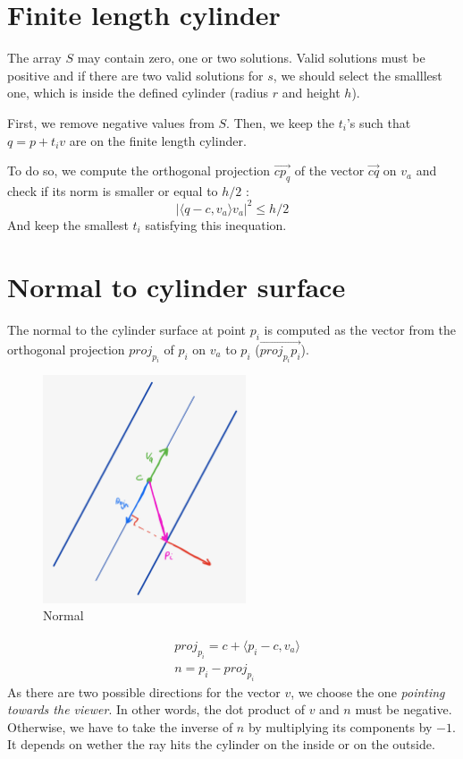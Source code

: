 \documentclass{article}
\begin{document}
\section{Finite length cylinder}
The array $S$ may contain zero, one or two solutions. Valid solutions must be positive and if there are two valid solutions for $s$, we should select the smalllest one, which is inside the defined cylinder (radius $r$ and height $h$).

First, we remove negative values from $S$. Then, we keep the $t_i$'s such that $q = p+t_iv$ are on the finite length cylinder.

To do so, we compute the orthogonal projection $\overrightarrow{cp_q}$ of the vector $\overrightarrow{cq}$ on $v_a$ and check if its norm is smaller or equal to $h/2$ :
$$|\langle q-c, v_a\rangle v_a|^2 \leq h/2$$
And keep the smallest $t_i$ satisfying this inequation.

\section{Normal to cylinder surface}

The normal to the cylinder surface at point $p_i$ is computed as the vector from the orthogonal projection $proj_{p_i}$ of $p_i$ on $v_a$ to $p_i$ ($\overrightarrow{proj_{p_i}p_i}$).

\begin{figure}[h]
\centering
\includegraphics[width=6cm]{res/Normal_sketch.jpeg}
\caption{Normal}
\end{figure}


\begin{align*}
    &proj_{p_i} = c + \langle p_i-c, v_a \rangle \\
    &n = p_i - proj_{p_i}
\end{align*}
As there are two possible directions for the vector $v$, we choose the one \textit{pointing towards the viewer}. In other words, the dot product of $v$ and $n$ must be negative. Otherwise, we have to take the inverse of $n$ by multiplying its components by $-1$. It depends on wether the ray hits the cylinder on the inside or on the outside.
\end{document}
